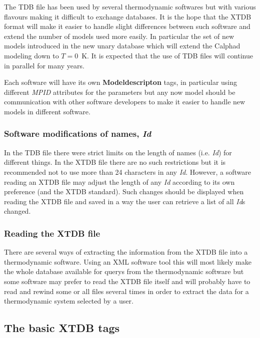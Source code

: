 \documentclass{article}
\begin{document}
The TDB file has been used by several thermodynamic softwares but with
various flavours making it difficult to exchange databases.  It is the
hope that the XTDB format will make it easier to handle slight
differences between such software and extend the number of models used
more easily.  In particular the set of new models introduced in the
new unary database which will extend the Calphad modeling down to
$T=0$~K.  It is expected that the use of TDB files will continue in
parallel for many years.

Each software will have its own {\bf Modeldescripton} tags, in
particular using different {\em MPID} attributes for the parameters
but any now model should be communication with other software
developers to make it easier to handle new models in different
software.

\subsubsection{Software modifications of names, {\em Id}}

In the TDB file there were strict limits on the length of names
(i.e. {\em Id}) for different things.  In the XTDB file there are no
such restrictions but it is recommended not to use more than 24
characters in any {\em Id}.  However, a software reading an XTDB file
may adjust the length of any {\em Id} according to its own preference
(and the XTDB standard).  Such changes should be displayed when
reading the XTDB file and saved in a way the user can retrieve a list
of all {\em Id}s changed.

\subsubsection{Reading the XTDB file}

There are several ways of extracting the information from the XTDB
file into a thermodynamic software.  Using an XML software tool this
will most likely make the whole database available for querys from the
thermodynamic software but some software may prefer to read the XTDB
file itself and will probably have to read and rewind some or all
files several times in order to extract the data for a thermodynamic
system selected by a user.


\newpage

\subsection{The basic XTDB tags}\label{sec:first}
\end{document}

